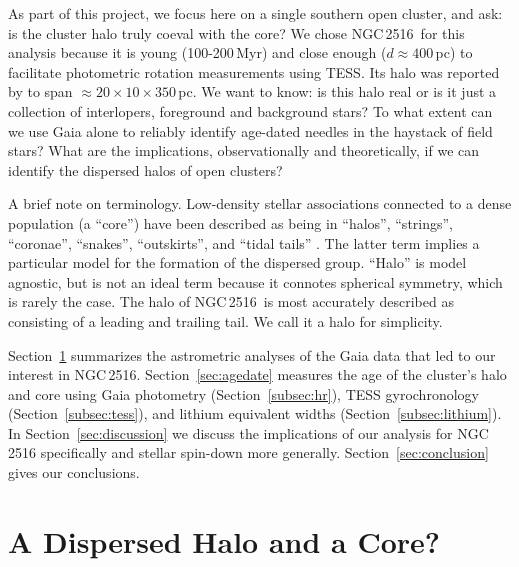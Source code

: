 \documentclass[12pt,twocolumn,tighten]{aastex63}
\newcommand{\cn}{NGC\,2516} %
\begin{document}
As part of this project, we focus here on a single southern open
cluster, and ask: is the cluster halo truly coeval with the core?  We
chose \cn\ for this analysis because it is young (100-200\,Myr) and
close enough ($d\approx400$\,pc) to facilitate photometric
rotation measurements using TESS.  Its halo was reported by
\citet{kounkel_untangling_2019} to span
$\approx20\times10\times350$\,pc.  We want to know: is this halo real
or is it just a collection of interlopers, foreground and background
stars?  To what extent can we use Gaia alone to reliably identify
age-dated needles in the haystack of field stars?  What are the
implications, observationally and theoretically, if we can identify
the dispersed halos of open clusters?

A brief note on terminology.  Low-density stellar associations
connected to a dense population (a ``core'') have been described as
being in ``halos'', ``strings'', ``coronae'', ``snakes'',
``outskirts'', and ``tidal tails'' \citep[{\it
e.g.},][]{chumak_tails_2006,davenport_death_2010,kounkel_untangling_2019,roser_hyades_2019,tian_discovery_2020,meingast_2021}.
The latter term implies a particular model for the formation of the
dispersed group.  ``Halo'' is model agnostic, but is not
an ideal term because it connotes spherical symmetry, which is rarely
the case.  The halo of \cn\ is most accurately described as consisting
of a leading and trailing tail.  We call it a halo for simplicity.

Section~\ref{sec:gaia} summarizes the astrometric analyses of the Gaia
data that led to our interest in \cn.  Section~\ref{sec:agedate}
measures the age of the cluster's halo and core using Gaia photometry
(Section~\ref{subsec:hr}), TESS gyrochronology
(Section~\ref{subsec:tess}), and lithium equivalent widths
(Section~\ref{subsec:lithium}).  In Section~\ref{sec:discussion} we
discuss the implications of our analysis for NGC\,2516 specifically
and stellar spin-down more generally.  Section~\ref{sec:conclusion}
gives our conclusions.


\section{A Dispersed Halo and a Core?}
\label{sec:gaia}
\end{document}
